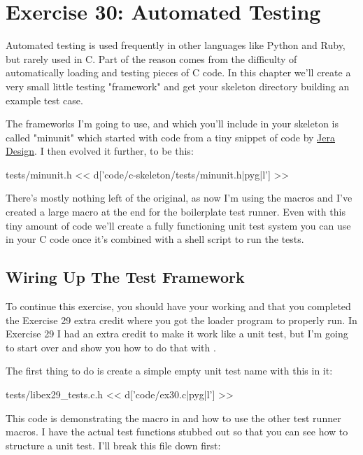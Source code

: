\chapter{Exercise 30: Automated Testing}

Automated testing is used frequently in other languages like Python and Ruby, but
rarely used in C.  Part of the reason comes from the difficulty of automatically
loading and testing pieces of C code.  In this chapter we'll create a very small
little testing "framework" and get your skeleton directory building an example
test case.

The frameworks I'm going to use, and which you'll include in your 
skeleton is called "minunit" which started with code from a tiny snippet
of code by \href{http://www.jera.com/techinfo/jtns/jtn002.html}{Jera Design}.  I then
evolved it further, to be this:

\begin{code}{tests/minunit.h}
<< d['code/c-skeleton/tests/minunit.h|pyg|l'] >>
\end{code}

There's mostly nothing left of the original, as now I'm using the  
macros and I've created a large macro at the end for the boilerplate test
runner.  Even with this tiny amount of code we'll create a fully functioning
unit test system you can use in your C code once it's combined with a 
shell script to run the tests.

\section{Wiring Up The Test Framework}

To continue this exercise, you should have your  working
and that you completed the Exercise 29 extra credit where you got the 
 loader program to properly run.  In Exercise 29 I had
an extra credit to make it work like a unit test, but I'm going to start
over and show you how to do that with .

The first thing to do is create a simple empty unit test name  with this in it:

\begin{code}{tests/libex29\_tests.c.h}
<< d['code/ex30.c|pyg|l'] >>
\end{code}

This code is demonstrating the  macro in 
and how to use the other test runner macros.  I have the actual test functions
stubbed out so that you can see how to structure a unit test.  I'll break
this file down first:

